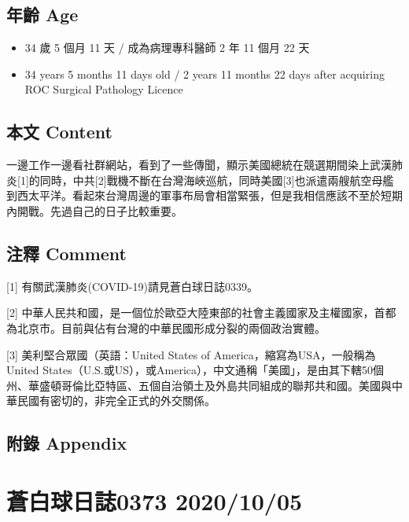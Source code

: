 \documentclass[
]{article}
\providecommand{\tightlist}{%
  \setlength{\itemsep}{0pt}\setlength{\parskip}{0pt}}
\begin{document}
\hypertarget{ux5e74ux9f61-age-31}{%
\subsection{年齡 Age}\label{ux5e74ux9f61-age-31}}

\begin{itemize}
\tightlist
\item
  34 歲 5 個月 11 天 / 成為病理專科醫師 2 年 11 個月 22 天
\item
  34 years 5 months 11 days old / 2 years 11 months 22 days after
  acquiring ROC Surgical Pathology Licence
\end{itemize}

\hypertarget{ux672cux6587-content-31}{%
\subsection{本文 Content}\label{ux672cux6587-content-31}}

一邊工作一邊看社群網站，看到了一些傳聞，顯示美國總統在競選期間染上武漢肺炎{[}1{]}的同時，中共{[}2{]}戰機不斷在台灣海峽巡航，同時美國{[}3{]}也派遣兩艘航空母艦到西太平洋。看起來台灣周邊的軍事布局會相當緊張，但是我相信應該不至於短期內開戰。先過自己的日子比較重要。

\hypertarget{ux6ce8ux91cb-comment-31}{%
\subsection{注釋 Comment}\label{ux6ce8ux91cb-comment-31}}

{[}1{]} 有關武漢肺炎(COVID-19)請見蒼白球日誌0339。

{[}2{]}
中華人民共和國，是一個位於歐亞大陸東部的社會主義國家及主權國家，首都為北京市。目前與佔有台灣的中華民國形成分裂的兩個政治實體。

{[}3{]} 美利堅合眾國（英語：United States of
America，縮寫為USA，一般稱為United
States（U.S.或US），或America），中文通稱「美國」，是由其下轄50個州、華盛頓哥倫比亞特區、五個自治領土及外島共同組成的聯邦共和國。美國與中華民國有密切的，非完全正式的外交關係。

\hypertarget{ux9644ux9304-appendix-31}{%
\subsection{附錄 Appendix}\label{ux9644ux9304-appendix-31}}

\hypertarget{ux84bcux767dux7403ux65e5ux8a8c0373-20201005}{%
\section{蒼白球日誌0373
2020/10/05}\label{ux84bcux767dux7403ux65e5ux8a8c0373-20201005}}
\end{document}
